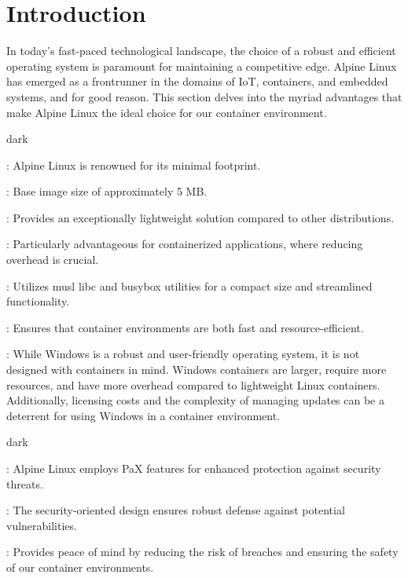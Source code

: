 \section{Introduction}
In today's fast-paced technological landscape, the choice of a robust and efficient operating system is paramount for maintaining a competitive edge.
Alpine Linux has emerged as a frontrunner in the domains of IoT, containers, and embedded systems, and for good reason.
This section delves into the myriad advantages that make Alpine Linux the ideal choice for our container environment.
\bigskip
{}
\label{Why Alpine?}
\begin{baseBoxThree}{}{dark}
    \bigskip
    \begin{posnexItemize}
        \item[\sA] : Alpine Linux is renowned for its minimal footprint.
        \item[\sA] : Base image size of approximately 5 MB.
        \item[\sA] : Provides an exceptionally lightweight solution compared to other distributions.
        \item[\sA] : Particularly advantageous for containerized applications, where reducing overhead is crucial.
        \item[\sA] : Utilizes musl libc and busybox utilities for a compact size and streamlined functionality.
        \item[\sA] : Ensures that container environments are both fast and resource-efficient.
        \item[\sA] : While Windows is a robust and user-friendly operating system, it is not designed with containers in mind. Windows containers are larger, require more resources, and have more overhead compared to lightweight Linux containers. Additionally, licensing costs and the complexity of managing updates can be a deterrent for using Windows in a container environment.
    \end{posnexItemize}
    \smallskip
\end{baseBoxThree}

\label{Security-Focused}
\begin{baseBoxThree}{}{dark}
    \begin{posnexItemize}
        \item[\sA] : Alpine Linux employs PaX features for enhanced protection against security threats.
        \item[\sA] : The security-oriented design ensures robust defense against potential vulnerabilities.
        \item[\sA] : Provides peace of mind by reducing the risk of breaches and ensuring the safety of our container environments.
    \end{posnexItemize}
\end{baseBoxThree}

